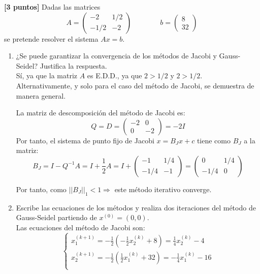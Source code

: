 \documentclass[12pt]{article}
\begin{document}
\begin{ejercicio}\textbf{[3 puntos]}
    Dadas las matrices
    $$A=\left( \begin{array}{cc}
        -2 & 1/2 \\
        -1/2 & -2
    \end{array}\right)
    \qquad \qquad
    b=\left( \begin{array}{c}
        8\\32
    \end{array}\right)$$
    se pretende resolver el sistema $Ax=b$.

    \begin{enumerate}
        \item ¿Se puede garantizar la convergencia de los métodos de Jacobi y Gauss-Seidel? Justifica la respuesta.\\
        
        Sí, ya que la matriz $A$ es E.D.D., ya que $2>1/2$ y $2>1/2$.\\

        Alternativamente, y solo para el caso del método de Jacobi, se demuestra de manera general.
        
        La matriz de descomposición del método de Jacobi es:
        $$Q=D=\left( \begin{array}{cc}
            -2 & 0 \\
            0 & -2
        \end{array}\right) = -2I$$
        Por tanto, el sistema de punto fijo de Jacobi $x=B_J x + c$  tiene como $B_J$ a la matriz:
        $$B_J = I-Q^{-1}A = I+\frac{1}{2}A=I + \left( \begin{array}{cc}
            -1 & 1/4 \\
            -1/4 & -1
        \end{array}\right)
        = \left( \begin{array}{cc}
            0 & 1/4 \\
            -1/4 & 0
        \end{array}\right)$$

        Por tanto, como $||B_J||_1 < 1 \Longrightarrow $ este método iterativo converge.

        \item Escribe las ecuaciones de los métodos y realiza dos iteraciones del método de Gauss-Seidel partiendo de $x^{(0)}=(0,0)$.\\

        Las ecuaciones del método de Jacobi son:
        \begin{equation*}
            \left\{\begin{array}{l}
                x_1^{(k+1)} = -\frac{1}{2}\left( -\frac{1}{2}x_2^{(k)} + 8 \right) = \frac{1}{4}x_2^{(k)} - 4 \\
                x_2^{(k+1)} = -\frac{1}{2}\left( \frac{1}{2}x_1^{(k)} + 32 \right) =  -\frac{1}{4}x_1^{(k)} - 16\\
            \end{array} \right.
        \end{equation*}
        

\end{enumerate}
\end{ejercicio}
\end{document}
